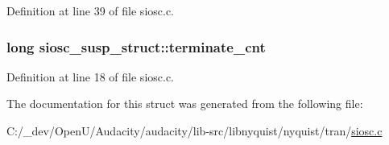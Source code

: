 Definition at line 39 of file siosc.\+c.

\subsubsection[{\texorpdfstring{terminate\+\_\+cnt}{terminate_cnt}}]{\setlength{\rightskip}{0pt plus 5cm}long siosc\+\_\+susp\+\_\+struct\+::terminate\+\_\+cnt}\hypertarget{structsiosc__susp__struct_afb123e4b22653b8bdd83a83cbe5d47d6}{}\label{structsiosc__susp__struct_afb123e4b22653b8bdd83a83cbe5d47d6}


Definition at line 18 of file siosc.\+c.



The documentation for this struct was generated from the following file\+:\begin{DoxyCompactItemize}
\item 
C\+:/\+\_\+dev/\+Open\+U/\+Audacity/audacity/lib-\/src/libnyquist/nyquist/tran/\hyperlink{siosc_8c}{siosc.\+c}\end{DoxyCompactItemize}
